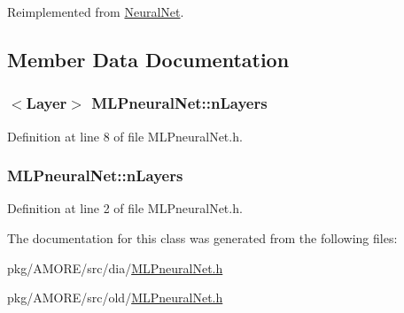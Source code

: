 Reimplemented from \hyperlink{class_neural_net_a3088aef3aa1fa865621a9609b12c948c}{NeuralNet}.



\subsection{Member Data Documentation}
\hypertarget{class_m_l_pneural_net_a104c89adf87a30b2cf67a456612e5125}{
\subsubsection[{nLayers}]{$<${\bf Layer}$>$ {\bf MLPneuralNet::nLayers}}}
\label{class_m_l_pneural_net_a104c89adf87a30b2cf67a456612e5125}


Definition at line 8 of file MLPneuralNet.h.

\hypertarget{class_m_l_pneural_net_a47ac9b8f98813bf63598c78ad444d6db}{
\subsubsection[{nLayers}]{ {\bf MLPneuralNet::nLayers}}}
\label{class_m_l_pneural_net_a47ac9b8f98813bf63598c78ad444d6db}


Definition at line 2 of file MLPneuralNet.h.



The documentation for this class was generated from the following files:\begin{DoxyCompactItemize}
\item 
pkg/AMORE/src/dia/\hyperlink{dia_2_m_l_pneural_net_8h}{MLPneuralNet.h}\item 
pkg/AMORE/src/old/\hyperlink{old_2_m_l_pneural_net_8h}{MLPneuralNet.h}\end{DoxyCompactItemize}

